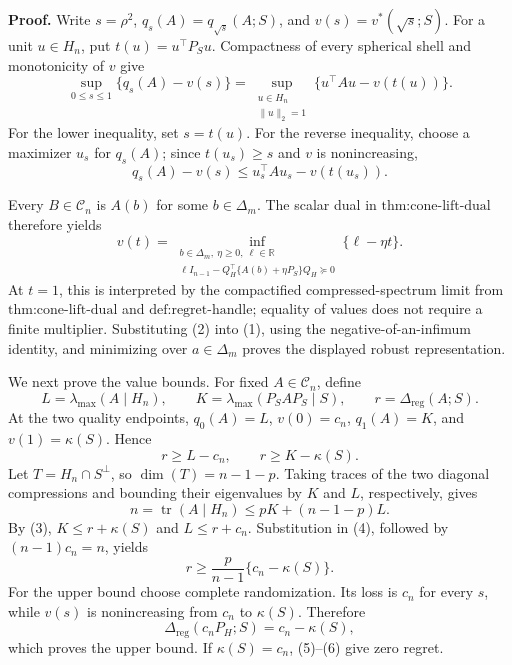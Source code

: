 \textbf{Proof.}
Write \(s=\rho^2\), \(q_s(A)=q_{\sqrt{s}}(A;S)\), and \(v(s)=v^*(\sqrt{s};S)\).  For a unit \(u\in H_n\), put \(t(u)=u^\top P_Su\).  Compactness of every spherical shell and monotonicity of \(v\) give
\[
\sup_{0\leq s\leq1}\{q_s(A)-v(s)\}
=\sup_{\substack{u\in H_n\\\|u\|_2=1}}
\{u^\top Au-v(t(u))\}.
\tag{1}
\]
For the lower inequality, set \(s=t(u)\).  For the reverse inequality, choose a maximizer \(u_s\) for \(q_s(A)\); since \(t(u_s)\geq s\) and \(v\) is nonincreasing,
\[
q_s(A)-v(s)\leq u_s^\top Au_s-v(t(u_s)).
\]

Every \(B\in\mathcal C_n\) is \(A(b)\) for some \(b\in\Delta_m\).  The scalar dual in \(\text{thm:cone-lift-dual}\) therefore yields
\[
v(t)=
\inf_{\substack{b\in\Delta_m,\ \eta\geq0,\ \ell\in\mathbb R\\
\ell I_{n-1}-Q_H^\top\{A(b)+\eta P_S\}Q_H\succeq0}}
\{\ell-\eta t\}.
\tag{2}
\]
At \(t=1\), this is interpreted by the compactified compressed-spectrum limit from \(\text{thm:cone-lift-dual}\) and \(\text{def:regret-handle}\); equality of values does not require a finite multiplier.  Substituting (2) into (1), using the negative-of-an-infimum identity, and minimizing over \(a\in\Delta_m\) proves the displayed robust representation.

We next prove the value bounds.  For fixed \(A\in\mathcal C_n\), define
\[
L=\lambda_{\max}(A\mid H_n),
\qquad K=\lambda_{\max}(P_SAP_S\mid S),
\qquad r=\Delta_{\mathrm{reg}}(A;S).
\]
At the two quality endpoints, \(q_0(A)=L\), \(v(0)=c_n\), \(q_1(A)=K\), and \(v(1)=\kappa(S)\).  Hence
\[
r\geq L-c_n,
\qquad r\geq K-\kappa(S).
\tag{3}
\]
Let \(T=H_n\cap S^\perp\), so \(\dim(T)=n-1-p\).  Taking traces of the two diagonal compressions and bounding their eigenvalues by \(K\) and \(L\), respectively, gives
\[
n=\operatorname{tr}(A\mid H_n)
\leq pK+(n-1-p)L.
\tag{4}
\]
By (3), \(K\leq r+\kappa(S)\) and \(L\leq r+c_n\).  Substitution in (4), followed by \((n-1)c_n=n\), yields
\[
r\geq\frac{p}{n-1}\{c_n-\kappa(S)\}.
\tag{5}
\]
For the upper bound choose complete randomization.  Its loss is \(c_n\) for every \(s\), while \(v(s)\) is nonincreasing from \(c_n\) to \(\kappa(S)\).  Therefore
\[
\Delta_{\mathrm{reg}}(c_nP_H;S)=c_n-\kappa(S),
\tag{6}
\]
which proves the upper bound.  If \(\kappa(S)=c_n\), (5)--(6) give zero regret.

